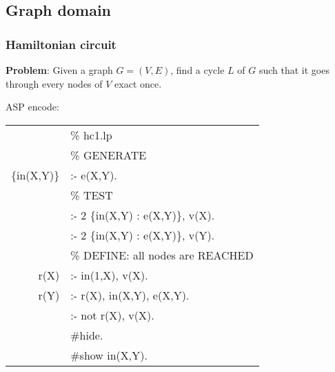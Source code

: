 \subsection{Graph domain}
\begin{frame}
  \frametitle{Hamiltonian circuit}
  \textbf{Problem}: Given a graph $G=(V,E)$, find a cycle $L$ of $G$ such that it goes through every nodes of $V$ exact once.

  ASP encode:
  \begin{center}
  \small{\begin{tabular}{rl}
  &  \% hc1.lp\\
  &\% {\color{blue} GENERATE }\\
  \{in(X,Y)\} & :- e(X,Y).\\
  &\% {\color{blue}TEST} \\
    &:- 2 \{in(X,Y) : e(X,Y)\}, v(X).\\
    &:- 2 \{in(X,Y) : e(X,Y)\}, v(Y).\\
    & \% {\color{blue} DEFINE: all nodes are REACHED}\\
    r(X) &:- in(1,X), v(X).\\
    r(Y) &:- r(X), in(X,Y), e(X,Y).\\
    &:- not r(X), v(X).\\
   & \#hide.\\
   & \#show in(X,Y).
  \end{tabular}}
  \end{center}
\end{frame}


